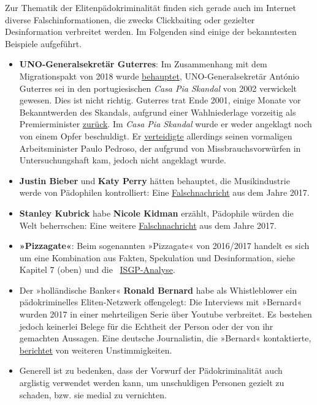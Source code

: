 Zur Thematik der Elitenpädokriminalität finden sich gerade auch im
Internet diverse Falschinformationen, die zwecks Clickbaiting oder
gezielter Desinformation verbreitet werden. Im Folgenden sind einige der
bekanntesten Beispiele aufgeführt.

\begin{itemize}
\tightlist
\item
  \textbf{UNO-Generalsekretär Guterres}: Im Zusammenhang mit dem
  Migrationspakt von 2018 wurde
  \href{https://web.archive.org/web/20190803060543/https://www.epochtimes.de/politik/welt/der-mann-hinter-dem-un-pakt-war-guterres-in-die-schlimmste-kindsmissbrauchsserie-in-portugals-geschichte-verwickelt-a2721816.html}{behauptet},
  UNO-Generalsekretär António Guterres sei in den portugiesischen
  \emph{Casa Pia Skandal} von 2002 verwickelt gewesen. Dies ist nicht
  richtig. Guterres trat Ende 2001, einige Monate vor Bekanntwerden des
  Skandals, aufgrund einer Wahlniederlage vorzeitig als Premierminister
  \href{https://en.wikipedia.org/wiki/Ant\%C3\%B3nio_Guterres\#Second_term_(1999\%E2\%80\%932002)}{zurück}.
  Im \emph{Casa Pia Skandal} wurde er weder angeklagt noch von einem
  Opfer beschuldigt. Er
  \href{http://www.richardwebster.net/print/xportuguesekincora.htm}{verteidigte}
  allerdings seinen vormaligen Arbeitsminister Paulo Pedroso, der
  aufgrund von Missbrauchsvorwürfen in Untersuchungshaft kam, jedoch
  nicht angeklagt wurde.
\item
  \textbf{Justin Bieber} und \textbf{Katy Perry} hätten behauptet, die
  Musikindustrie werde von Pädophilen kontrolliert: Eine
  \href{https://www.snopes.com/fact-check/pedophiles-music-industry/}{Falschnachricht}
  aus dem Jahre 2017.
\item
  \textbf{Stanley Kubrick} habe \textbf{Nicole Kidman} erzählt,
  Pädophile würden die Welt beherrschen: Eine weitere
  \href{https://archive.is/WoK7T}{Falschnachricht} aus dem Jahre 2017.
\item
  \textbf{»Pizzagate«}: Beim sogenannten »Pizzagate« von 2016/2017
  handelt es sich um eine Kombination aus Fakten, Spekulation und
  Desinformation, siehe Kapitel 7 (oben) und die~
  \href{https://isgp-studies.com/pizzagate}{ISGP-Analyse}.
\item
  Der »holländische Banker« \textbf{Ronald Bernard} habe als
  Whistleblower ein pädokriminelles Eliten-Netzwerk offengelegt: Die
  Interviews mit »Bernard« wurden 2017 in einer mehrteiligen Serie über
  Youtube verbreitet. Es bestehen jedoch keinerlei Belege für die
  Echtheit der Person oder der von ihr gemachten Aussagen. Eine deutsche
  Journalistin, die »Bernard« kontaktierte,
  \href{https://steemit.com/whistleblower/@mayb/i-just-quit-working-for-dutch-whistleblower-ronald-bernard-here-s-why}{berichtet}
  von weiteren Unstimmigkeiten.
\item
  Generell ist zu bedenken, dass der Vorwurf der Pädokriminalität auch
  arglistig verwendet werden kann, um unschuldigen Personen gezielt zu
  schaden, bzw. sie medial zu vernichten.
\end{itemize}

